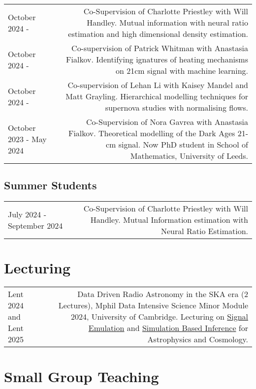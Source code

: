 \documentclass{article}
\begin{document}
\begin{tabular}{L!{\vrule}R}
    October 2024 - & Co-Supervision of Charlotte Priestley  with Will Handley. Mutual information with neural ratio estimation and high dimensional density estimation. \\
    October 2024 - & Co-supervision of Patrick Whitman with Anastasia Fialkov. Identifying ignatures of heating mechanisms on 21cm signal with machine learning. \\
    October 2024 - & Co-supervision of Lehan Li with Kaisey Mandel and Matt Grayling. Hierarchical modelling techniques for supernova studies with normalising flows. \\
    October 2023 - May 2024 & Co-Supervision of Nora Gavrea with Anastasia Fialkov. Theoretical modelling of the Dark Ages 21-cm signal. Now PhD student in School of Mathematics, University of Leeds. \\
\end{tabular}

\subsection*{Summer Students}

\begin{tabular}{L!{\vrule}R}
    July 2024 - September 2024 & Co-Supervision of Charlotte Priestley  with Will Handley. Mutual Information estimation with Neural Ratio Estimation. \\
\end{tabular}

\section*{Lecturing}

\begin{tabular}{L!{\vrule}R}
    Lent 2024 and Lent 2025 & Data Driven Radio Astronomy in the SKA era (2 Lectures), Mphil Data Intensive Science Minor Module 2024, University of Cambridge. Lecturing on \href{https://github.com/htjb/Talks/raw/master/Lectures/MPhil_Data_Intensive_Science_Lectures/Lecture-15.pdf}{Signal Emulation} and \href{https://github.com/htjb/Talks/raw/master/Lectures/MPhil_Data_Intensive_Science_Lectures/Lecture-16.pdf}{Simulation Based Inference} for Astrophysics and Cosmology.
\end{tabular}

\section*{Small Group Teaching}
\end{document}
